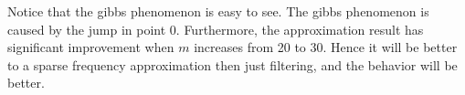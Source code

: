 \documentclass{article}
\begin{document}
Notice that the gibbs phenomenon is easy to see. The gibbs phenomenon is caused by the jump in point $0$.
Furthermore, the approximation result has significant improvement when $m$ increases from 20 to 30. Hence it will be better to a sparse frequency approximation then just filtering, and the behavior will be better.
\end{document}
